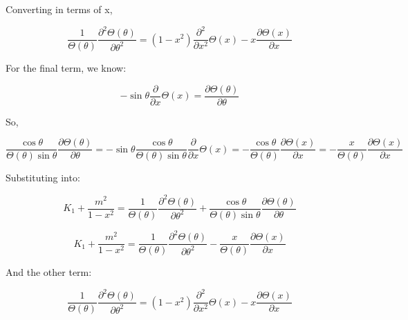 \documentclass[12pt]{article}
\renewcommand{\_}{\kern-1.5pt\textunderscore\kern-1.5pt}
\begin{document}
Converting in terms of x,\par

 \[ \frac{1}{ \Theta  \left(  \theta  \right) }\frac{ \partial ^{2} \Theta  \left(  \theta  \right) }{ \partial  \theta ^{2}}= \left( 1-x^{2} \right) \frac{ \partial ^{2}}{ \partial x^{2}} \Theta  \left( x \right) -x\frac{ \partial  \Theta  \left( x \right) }{ \partial x} \] \par

For the final term, we know:\par

 \[ -\sin  \theta \frac{ \partial }{ \partial x} \Theta  \left( x \right) =\frac{ \partial  \Theta  \left(  \theta  \right) }{ \partial  \theta } \] \par

So,\par

 \[ \frac{\cos  \theta }{ \Theta  \left(  \theta  \right) \sin  \theta }\frac{ \partial  \Theta  \left(  \theta  \right) }{ \partial  \theta }=-\sin  \theta \frac{\cos  \theta }{ \Theta  \left(  \theta  \right) \sin  \theta }\frac{ \partial }{ \partial x} \Theta  \left( x \right) =-\frac{\cos  \theta }{ \Theta  \left(  \theta  \right) }\frac{ \partial  \Theta  \left( x \right) }{ \partial x}=-\frac{x}{ \Theta  \left(  \theta  \right) }\frac{ \partial  \Theta  \left( x \right) }{ \partial x} \] \par

Substituting into:\par

 \[ K_{1}+\frac{m^{2}}{1-x^{2}}=\frac{1}{ \Theta  \left(  \theta  \right) }\frac{ \partial ^{2} \Theta  \left(  \theta  \right) }{ \partial  \theta ^{2}}+\frac{\cos  \theta }{ \Theta  \left(  \theta  \right) \sin  \theta }\frac{ \partial  \Theta  \left(  \theta  \right) }{ \partial  \theta } \] \par

 \[ K_{1}+\frac{m^{2}}{1-x^{2}}=\frac{1}{ \Theta  \left(  \theta  \right) }\frac{ \partial ^{2} \Theta  \left(  \theta  \right) }{ \partial  \theta ^{2}}-\frac{x}{ \Theta  \left(  \theta  \right) }\frac{ \partial  \Theta  \left( x \right) }{ \partial x} \] \par

And the other term:\par

 \[ \frac{1}{ \Theta  \left(  \theta  \right) }\frac{ \partial ^{2} \Theta  \left(  \theta  \right) }{ \partial  \theta ^{2}}= \left( 1-x^{2} \right) \frac{ \partial ^{2}}{ \partial x^{2}} \Theta  \left( x \right) -x\frac{ \partial  \Theta  \left( x \right) }{ \partial x} \] \par
\end{document}
